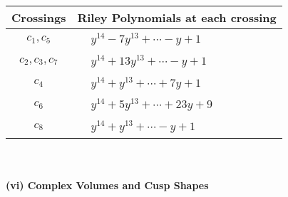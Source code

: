 \documentclass[1p]{elsarticle_modified}
\theoremstyle{definition}
\begin{document}
\begin{tabular}{m{50pt}|m{274pt}}
Crossings & \hspace{64pt}Riley Polynomials at each crossing \\
\hline $$\begin{aligned}c_{1},c_{5}\end{aligned}$$&$\begin{aligned}
&y^{14}-7 y^{13}+\cdots- y+1
\end{aligned}$\\
\hline $$\begin{aligned}c_{2},c_{3},c_{7}\end{aligned}$$&$\begin{aligned}
&y^{14}+13 y^{13}+\cdots- y+1
\end{aligned}$\\
\hline $$\begin{aligned}c_{4}\end{aligned}$$&$\begin{aligned}
&y^{14}+y^{13}+\cdots+7 y+1
\end{aligned}$\\
\hline $$\begin{aligned}c_{6}\end{aligned}$$&$\begin{aligned}
&y^{14}+5 y^{13}+\cdots+23 y+9
\end{aligned}$\\
\hline $$\begin{aligned}c_{8}\end{aligned}$$&$\begin{aligned}
&y^{14}+y^{13}+\cdots- y+1
\end{aligned}$\\
\hline
\end{tabular}\\~\\
\newpage\flushleft \textbf{(vi) Complex Volumes and Cusp Shapes}
\end{document}
